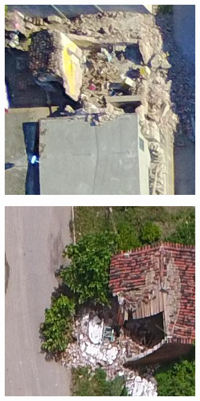 \begin{figure}[!h]
  \centering
    \begin{subfigure}{.24\textwidth}
        \includegraphics[width=\textwidth]{images/damaged1.jpg}
    \end{subfigure}
    \begin{subfigure}{.24\textwidth}
        \includegraphics[width=\textwidth]{images/damaged2.jpg}

\end{subfigure}
\end{figure}
